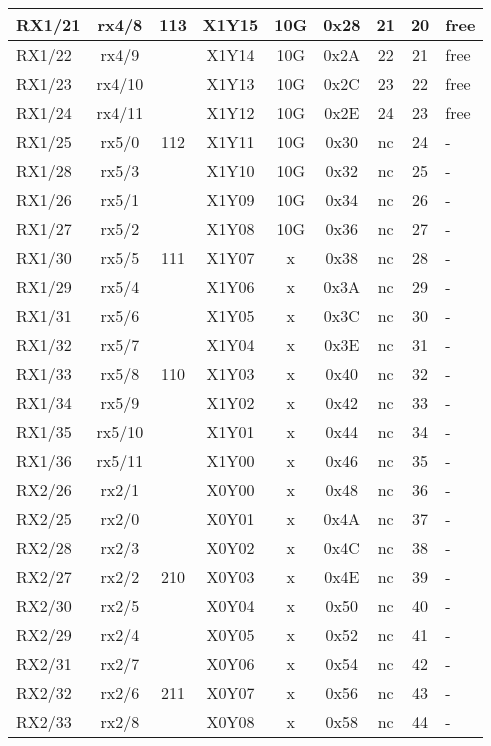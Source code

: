 \begin{longtable}{|l|c|c|c|c|c|c|c|l|}
RX1/21 & rx4/8  & 113 & X1Y15 & 10G & 0x28 & 21 & 20 & free\\\hline
RX1/22 & rx4/9  &     & X1Y14 & 10G & 0x2A & 22 & 21 & free\\\hline
RX1/23 & rx4/10 &     & X1Y13 & 10G & 0x2C & 23 & 22 & free\\\hline
RX1/24 & rx4/11 &     & X1Y12 & 10G & 0x2E & 24 & 23 & free\\\hline
RX1/25 & rx5/0  & 112 & X1Y11 & 10G & 0x30 & nc & 24 & -\\\hline
RX1/28 & rx5/3  &     & X1Y10 & 10G & 0x32 & nc & 25 & -\\\hline
RX1/26 & rx5/1  &     & X1Y09 & 10G & 0x34 & nc & 26 & -\\\hline
RX1/27 & rx5/2  &     & X1Y08 & 10G & 0x36 & nc & 27 & -\\\hline
RX1/30 & rx5/5  & 111 & X1Y07 &  x  & 0x38 & nc & 28 & -\\\hline
RX1/29 & rx5/4  &     & X1Y06 &  x  & 0x3A & nc & 29 & -\\\hline
RX1/31 & rx5/6  &     & X1Y05 &  x  & 0x3C & nc & 30 & -\\\hline
RX1/32 & rx5/7  &     & X1Y04 &  x  & 0x3E & nc & 31 & -\\\hline
RX1/33 & rx5/8  & 110 & X1Y03 &  x  & 0x40 & nc & 32 & -\\\hline
RX1/34 & rx5/9  &     & X1Y02 &  x  & 0x42 & nc & 33 & -\\\hline
RX1/35 & rx5/10 &     & X1Y01 &  x  & 0x44 & nc & 34 & -\\\hline
RX1/36 & rx5/11 &     & X1Y00 &  x  & 0x46 & nc & 35 & -\\\hline
RX2/26 & rx2/1  &     & X0Y00 &  x  & 0x48 & nc & 36 & -\\\hline
RX2/25 & rx2/0  &     & X0Y01 &  x  & 0x4A & nc & 37 & -\\\hline
RX2/28 & rx2/3  &     & X0Y02 &  x  & 0x4C & nc & 38 & -\\\hline
RX2/27 & rx2/2  & 210 & X0Y03 &  x  & 0x4E & nc & 39 & -\\\hline
RX2/30 & rx2/5  &     & X0Y04 &  x  & 0x50 & nc & 40 & -\\\hline
RX2/29 & rx2/4  &     & X0Y05 &  x  & 0x52 & nc & 41 & -\\\hline
RX2/31 & rx2/7  &     & X0Y06 &  x  & 0x54 & nc & 42 & -\\\hline
RX2/32 & rx2/6  & 211 & X0Y07 &  x  & 0x56 & nc & 43 & -\\\hline
RX2/33 & rx2/8  &     & X0Y08 &  x  & 0x58 & nc & 44 & -\\\hline

\end{longtable}
